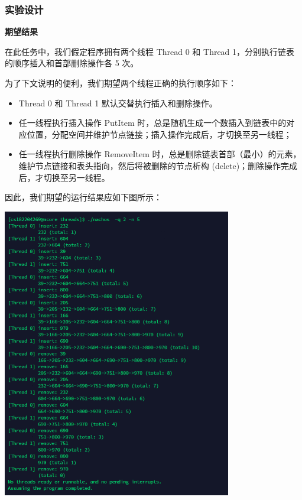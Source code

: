 \documentclass[a4paper,12pt]{article}
\begin{document}
\subsubsection{实验设计}
\par \textbf{\hspace{1em}期望结果}
\par 在此任务中，我们假定程序拥有两个线程 Thread 0 和 Thread 1，分别执行链表的顺序插入和首部删除操作各 5 次。
\par 为了下文说明的便利，我们期望两个线程正确的执行顺序如下：
\begin{itemize}
\item Thread 0 和 Thread 1 默认交替执行插入和删除操作。
\item 任一线程执行插入操作 PutItem 时，总是随机生成一个数插入到链表中的对应位置，分配空间并维护节点链接；插入操作完成后，才切换至另一线程；
\item 任一线程执行删除操作 RemoveItem 时，总是删除链表首部（最小）的元素，维护节点链接和表头指向，然后将被删除的节点析构 (delete)；删除操作完成后，才切换至另一线程。   
\end{itemize}

\par 因此，我们期望的运行结果应如下图所示：
\begin{center}
    \includegraphics[width=10cm]{images/result/5.png}
\end{center}
\end{document}
